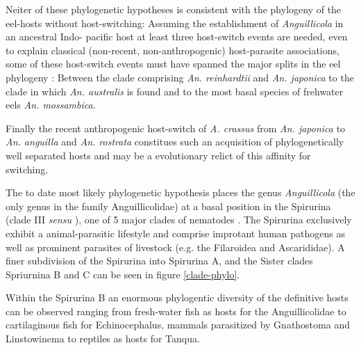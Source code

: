 

Neiter of these phylogenetic hypotheses is consistent with the
phylogeny of the eel-hosts without host-switching: Assuming the
establishment of \textit{Anguillicola} in an ancestral Indo- pacific
host at least three host-switch events are needed, even to explain
classical (non-recent, non-anthropogenic) host-parasite associations,
some of these host-switch events must have spanned the major splits in
the eel phylogeny \cite{minegishi_molecular_2005}: Between the clade
comprising \textit{An. reinhardtii} and \textit{An. japonica} to the
clade in which \textit{An. australis} is found and to the most basal
species of frehwater eels \textit{An. mossambica}.

Finally the recent anthropogenic host-switch of \textit{A. crassus}
from \textit{An. japonica} to \textit{An. anguilla} and
\textit{An. rostrata} constitues such an acquisition of
phylogenetically well separated hosts and may be a evolutionary relict
of this affinity for switching.

The to date most likely phylogenetic hypothesis places the genus
\textit{Anguillicola} (the only genus in the family Anguillicolidae)
at a basal position in the Spirurina (clade III \textit{sensu}
\cite{blaxter_molecular_1998}), one of 5 major clades of nematodes
\cite{nadler_molecular_2007, wijov_evolutionary_2006}. The Spirurina
exclusively exhibit a animal-parasitic lifestyle and comprise
improtant human pathogens as well as prominent parasites of livestock
(e.g. the Filaroidea and Ascarididae). A finer subdivision of the
Spirurina into Spirurina A, and the Sister clades Spriurnina B and C
can be seen in figure \ref{clade-phylo}.

Within the Spirurina B an enormous phylogentic diversity of the
definitive hosts can be observed ranging from fresh-water fish as
hosts for the Anguillicolidae to cartilaginous fish for
Echinocephalus, mammals parasitized by Gnathostoma and Linstowinema to
reptiles as hosts for Tanqua.

